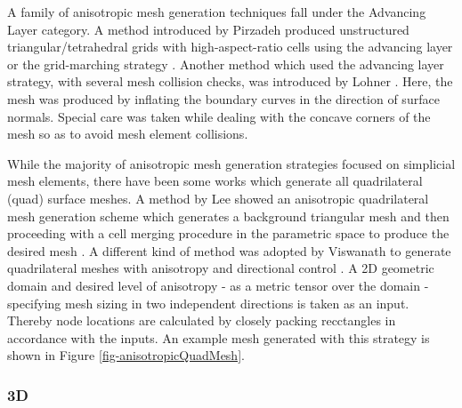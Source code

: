 A family of anisotropic mesh generation techniques fall under the Advancing Layer category. A method introduced by Pirzadeh produced unstructured triangular/tetrahedral grids with high-aspect-ratio cells using the advancing layer or the grid-marching strategy \cite{pirzadeh1994unstructured}. Another method which used the advancing layer strategy, with several mesh collision checks, was introduced by Lohner \cite{lohner1993matching}. Here, the mesh was produced by inflating the boundary curves in the direction of surface normals. Special care was taken while dealing with the concave corners of the mesh so as to avoid mesh element collisions.

While the majority of anisotropic mesh generation strategies focused on simplicial mesh elements, there have been some works which generate all quadrilateral (quad) surface meshes. A method by Lee \etal showed an anisotropic quadrilateral mesh generation scheme which generates a background triangular mesh and then proceeding with a cell merging procedure in the parametric space to produce the desired mesh \cite{lee2003new}. A different kind of method was adopted by Viswanath \etal to generate quadrilateral meshes with anisotropy and directional control \cite{viswanath2000quadrilateral}. A 2D geometric domain and desired level of anisotropy - as a metric tensor over the domain - specifying mesh sizing in two independent directions is taken as an input. Thereby node locations are calculated by closely packing recctangles in accordance with the inputs. An example mesh generated with this strategy is shown in Figure \ref{fig-anisotropicQuadMesh}.

\subsubsection{3D}
\label{sec-3D}

